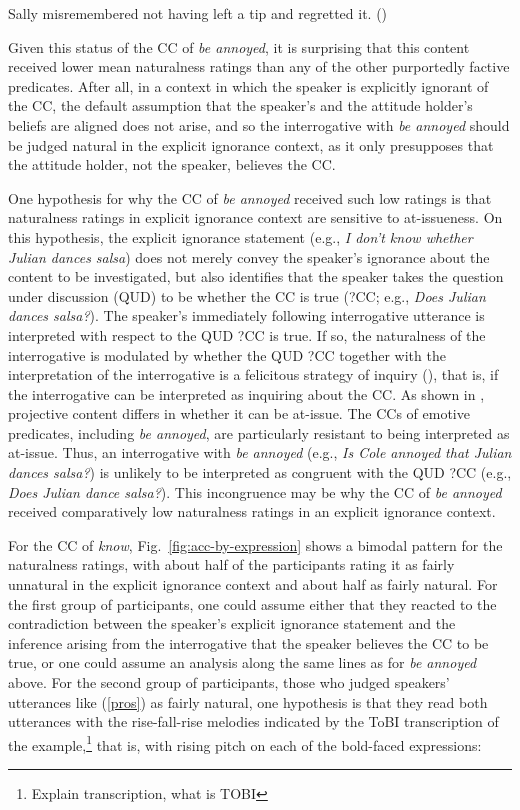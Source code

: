 \documentclass[11pt,fleqn]{article}
\newcommand{\6}{\mbox{$[\hspace*{-.6mm}[$}}
\newcommand{\9}{\mbox{$]\hspace*{-.6mm}]$}}
\begin{document}
\begin{exe}
\ex\label{emo} Sally misremembered not having left a tip and regretted it. \hfill (\citealt[712]{karttunen2016})
\end{exe}
Given this status of the CC of {\em be annoyed}, it is surprising that this content received lower mean naturalness ratings than any of the other purportedly factive predicates. After all, in a context in which the speaker is explicitly ignorant of the CC, the default assumption that the speaker's and the attitude holder's beliefs are aligned does not arise, and so the interrogative with {\em be annoyed} should be judged natural in the explicit ignorance context, as it only presupposes that the attitude holder, not the speaker, believes the CC.

One hypothesis for why the CC of {\em be annoyed} received such low ratings is that naturalness ratings in explicit ignorance context are sensitive to at-issueness. On this hypothesis, the explicit ignorance statement (e.g., {\em I don't know whether Julian dances salsa}) does not merely convey the speaker's ignorance about the content to be investigated, but also identifies that the speaker takes the question under discussion (QUD) to be whether the CC is true (?CC; e.g., {\em Does Julian dances salsa?}). The speaker's immediately following interrogative utterance is interpreted with respect to the QUD ?CC is true. If so, the naturalness of the interrogative is modulated by whether the QUD ?CC  together with the interpretation of the interrogative is a felicitous strategy of inquiry (\citealt[32f.]{roberts12}), that is, if the interrogative can be interpreted as inquiring about the CC. As shown in \citealt{tbd-variability}, projective content differs in whether it can be at-issue. The CCs of emotive predicates, including {\em be annoyed}, are particularly resistant to being interpreted as at-issue. Thus, an interrogative with {\em be annoyed} (e.g., {\em Is Cole annoyed that Julian dances salsa?}) is unlikely to be interpreted as congruent with the QUD ?CC (e.g., {\em Does Julian dance salsa?}). This incongruence may be why the CC of {\em be annoyed} received comparatively low naturalness ratings in an explicit ignorance context.

For the CC of {\em know}, Fig.~\ref{fig:acc-by-expression} shows a bimodal pattern for the naturalness ratings, with about half of the participants rating it as fairly unnatural in the explicit ignorance context and about half as fairly natural. For the first group of participants, one could assume either that they reacted to the contradiction between the speaker's explicit ignorance statement and the inference arising from the interrogative that the speaker believes the CC to be true, or one could assume an analysis along the same lines as for {\em be annoyed} above. For the second group of participants, those who judged speakers' utterances like (\ref{pros}) as fairly natural, one hypothesis is that they read both utterances with the rise-fall-rise melodies indicated by the ToBI transcription of the example,\footnote{Explain transcription, what is TOBI} that is, with rising pitch on each of the bold-faced expressions:
\end{document}
